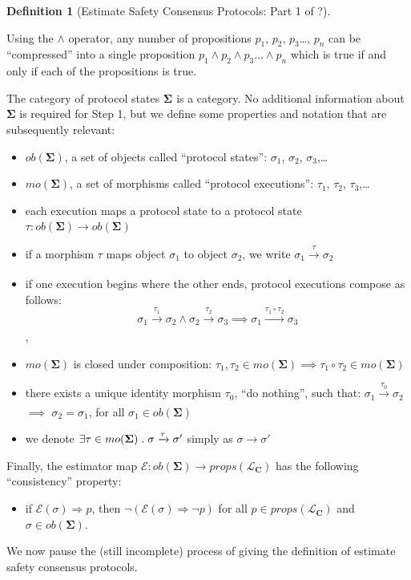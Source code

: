 \documentclass{article}
\theoremstyle{definition}
\newtheorem{defn}{Definition}[section]
\newcommand{\cat}{
	\mathbf
}
\begin{document}
\begin{defn}[Estimate Safety Consensus Protocols: Part 1 of ?]
\begin{description}
Using the $\land$ operator, any number of propositions $p_1$, $p_2$, $p_3$\ldots, $p_n$ can be ``compressed'' into a single proposition $p_1 \land p_2 \land p_3\ldots \land p_n$ which is true if and only if each of the propositions is true.

The category of protocol states $\cat{\Sigma}$ is a category. No additional information about $\cat{\Sigma}$ is required for Step 1, but we define some properties and notation that are subsequently relevant:

\begin{itemize}
\item $ob(\cat{\Sigma})$, a set of objects called ``protocol states'': $\sigma_1$, $\sigma_2$, $\sigma_3$,\ldots
\item $mo(\cat{\Sigma})$, a set of morphisms called ``protocol executions'': $\tau_1$, $\tau_2$, $\tau_3$,\ldots
\item each execution maps a protocol state to a protocol state $\tau:ob(\cat{\Sigma}) \to ob(\cat{\Sigma})$
\item if a morphism $\tau$ maps object $\sigma_1$ to object $\sigma_2$, we write $\sigma_1 \xrightarrow[]{\tau} \sigma_2$
\item if one execution begins where the other ends, protocol executions compose as follows:
$$\sigma_1 \xrightarrow[]{\tau_1} \sigma_2 \land \sigma_2 \xrightarrow[]{\tau_2} \sigma_3 \implies \sigma_1 \xrightarrow[]{\tau_1 \circ \tau_2} \sigma_3$$,
\item $mo(\cat{\Sigma})$ is closed under composition: $\tau_1, \tau_2 \in mo(\cat{\Sigma}) \implies \tau_1 \circ \tau_2 \in mo(\cat{\Sigma})$
\item there exists a unique identity morphism $\tau_0$, ``do nothing'', such that: $\sigma_1 \xrightarrow[]{\tau_0} \sigma_2$ $\implies$ $\sigma_2 = \sigma_1$, for all $\sigma_1 \in ob(\cat{\Sigma})$
\item we denote $\exists \tau \in mo(\cat{\Sigma}) \hspace{1mm} . \hspace{1mm} \sigma \xrightarrow[]{\tau} \sigma'$ simply as $\sigma \to \sigma'$
\end{itemize}


Finally, the estimator map $\mathcal{E}: ob(\cat{\Sigma}) \to props(\mathcal{L}_\cat{C})$ has the following ``consistency'' property:
\begin{itemize}
\item if $\mathcal{E}(\sigma) \Rightarrow p$, then $\neg{(\mathcal{E}(\sigma) \Rightarrow \neg p)}$ for all $p \in props(\mathcal{L}_\cat{C})$ and $\sigma \in ob(\cat{\Sigma})$.
\end{itemize}

We now pause the (still incomplete) process of giving the definition of estimate safety consensus protocols.
\end{description}
\end{defn}
\end{document}
